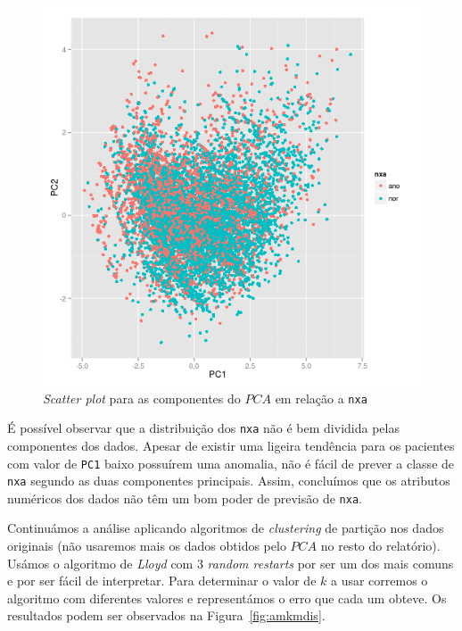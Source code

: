 \documentclass[10pt, conference, compsocconf]{IEEEtran}
\begin{document}
\begin{figure}[H]
  \centering
  \includegraphics[scale=0.4]{img/amv_pcast.png}
  \caption{\textit{Scatter plot} para as componentes do $PCA$ em relação a {\tt nxa}}
  \label{fig:ampcast}
\end{figure}

É possível observar que a distribuição dos {\tt nxa} não é bem
dividida pelas componentes dos dados. Apesar de existir uma ligeira
tendência para os pacientes com valor de {\tt PC1} baixo possuírem uma
anomalia, não é fácil de prever a classe de {\tt nxa} segundo as duas
componentes principais. Assim, concluímos que os atributos numéricos
dos dados não têm um bom poder de previsão de {\tt nxa}.

Continuámos a análise aplicando algoritmos de \textit{clustering} de
partição nos dados originais (não usaremos mais os dados obtidos pelo
$PCA$ no resto do relatório). Usámos o algoritmo de \textit{Lloyd} com
3 \textit{random restarts} por ser um dos mais comuns e por ser fácil
de interpretar. Para determinar o valor de $k$ a usar corremos o
algoritmo com diferentes valores e representámos o erro que cada um
obteve. Os resultados podem ser observados na
Figura~\ref{fig:amkmdis}.
\end{document}
